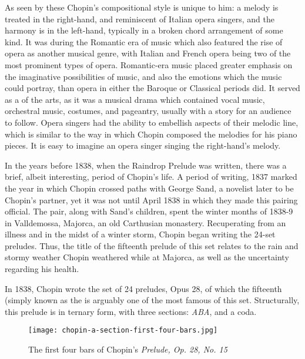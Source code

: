 As seen by these  Chopin's compositional style is unique to him: a melody is treated in the right-hand, and reminiscent of Italian opera singers, and the harmony is in the left-hand, typically in a broken chord arrangement of some kind. It was during the Romantic era of music which also featured the rise of opera as another musical genre, with Italian and French opera being two of the most prominent types of opera\autocite{Burkholder_Grout_Palisca_2014}. Romantic-era music placed greater emphasis on the imaginative possibilities of music, and also the emotions which the music could portray, than opera in either the Baroque or Classical periods did. It served as a  of the arts, as it was a musical drama which contained vocal music, orchestral music, costumes, and pageantry, usually with a story for an audience to follow. Opera singers had the ability to embellish aspects of their melodic line, which is similar to the way in which Chopin composed the melodies for his piano pieces. It is easy to imagine an opera singer singing the right-hand's melody.

In the years before 1838, when the Raindrop Prelude was written, there was a brief, albeit interesting, period of Chopin's life. A period of writing, 1837 marked the year in which Chopin crossed paths with George Sand, a novelist later to be Chopin's partner, yet it was not until April 1838 in which they made this pairing official. The pair, along with Sand's children, spent the winter months of 1838-9 in Valldemossa, Majorca, an old Carthusian monastery. Recuperating from an illness and in the midst of a winter storm, Chopin began writing the 24-set preludes\autocite{Samson_2001}. Thus, the title of the fifteenth prelude of this set relates to the rain and stormy weather Chopin weathered while at Majorca, as well as the uncertainty regarding his health.

In 1838, Chopin wrote the set of 24 preludes, Opus 28, of which the fifteenth (simply known as the  is arguably one of the most famous of this set. Structurally, this prelude is in ternary form, with three sections: \textit{ABA}, and a coda. 

\begin{figure}[h]
  \centering
  \texttt{[image: chopin-a-section-first-four-bars.jpg]}
  \caption{The first four bars of Chopin's \textit{Prelude, Op. 28, No. 15}}
  \label{fig:chopin-a-section-first-four-bars}
\end{figure}

